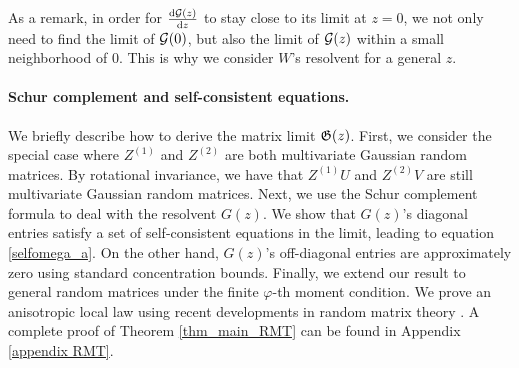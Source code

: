 As a remark, in order for $\frac{\dd \cal G(z)}{\dd z}$ to stay close to its limit at $z = 0$, we not only need to find the limit of $\cal G(0)$, but also the limit of $\cal G(z)$ within a small neighborhood of $0$.
This is why we consider $W$'s resolvent for a general $z$. %

\paragraph{Schur complement and self-consistent equations.}
We briefly describe how to derive the matrix limit $\Gi(z)$.
First, we consider the special case where $Z^{(1)}$ and $Z^{(2)}$ are both multivariate Gaussian random matrices.
By rotational invariance, we have that $Z^{(1)} U$ and $Z^{(2)} V$ are still multivariate Gaussian random matrices.
Next, we use the Schur complement formula to deal with the resolvent $G(z)$.
We show that $G(z)$'s diagonal entries satisfy a set of self-consistent equations in the limit, leading to equation \eqref{selfomega_a}.
On the other hand, $G(z)$'s off-diagonal entries are approximately zero using standard concentration bounds.
Finally, we extend our result to general random matrices under the finite $\varphi$-th moment condition.
We prove an anisotropic local law using recent developments in random matrix theory \cite{erdos2017dynamical,Anisotropic}.
A complete proof of Theorem \ref{thm_main_RMT} can be found in Appendix \ref{appendix RMT}.
